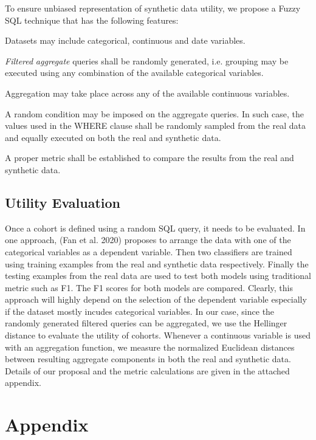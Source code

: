 To ensure unbiased representation of synthetic data utility, we propose
a Fuzzy SQL technique that has the following features:

Datasets may include categorical, continuous and date variables.

\emph{Filtered} \emph{aggregate} queries shall be randomly generated,
i.e. grouping may be executed using any combination of the available
categorical variables.

Aggregation may take place across any of the available continuous
variables.

A random condition may be imposed on the aggregate queries. In such
case, the values used in the WHERE clause shall be randomly sampled from
the real data and equally executed on both the real and synthetic data.

A proper metric shall be established to compare the results from the
real and synthetic data.

\hypertarget{utility-evaluation}{%
\subsection{Utility Evaluation}\label{utility-evaluation}}

Once a cohort is defined using a random SQL query, it needs to be
evaluated. In one approach, (Fan et al. 2020) proposes to arrange the
data with one of the categorical variables as a dependent variable. Then
two classifiers are trained using training examples from the real and
synthetic data respectively. Finally the testing examples from the real
data are used to test both models using traditional metric such as F1.
The F1 scores for both models are compared. Clearly, this approach will
highly depend on the selection of the dependent variable especially if
the dataset mostly incudes categorical variables. In our case, since the
randomly generated filtered queries can be aggregated, we use the
Hellinger distance to evaluate the utility of cohorts. Whenever a
continuous variable is used with an aggregation function, we measure the
normalized Euclidean distances between resulting aggregate components in
both the real and synthetic data. Details of our proposal and the metric
calculations are given in the attached appendix.

\hypertarget{appendix}{%
\section{Appendix}\label{appendix}}

